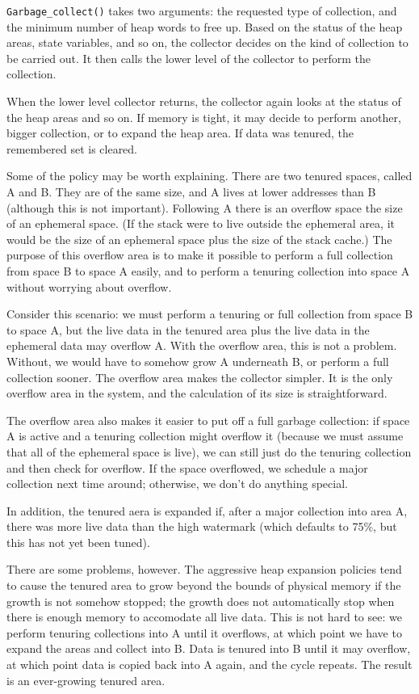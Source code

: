 \verb+Garbage_collect()+ takes two arguments: the requested type of
collection, and the minimum number of heap words to free up. Based on
the status of the heap areas, state variables, and so on, the collector
decides on the kind of collection to be carried out. It then calls the lower
level of the collector to perform the collection.

When the lower level collector returns, the collector again looks at the
status of the heap areas and so on. If memory is tight, it may decide to
perform another, bigger collection, or to expand the heap area. If data was
tenured, the remembered set is cleared.

Some of the policy may be worth explaining. There are two tenured spaces,
called A and B. They are of the same size, and A lives at lower addresses than
B (although this is not important). Following A there is an overflow
space the size of an ephemeral space. (If the stack were to live outside 
the ephemeral area, it would be the size of an ephemeral space plus the size
of the stack cache.) The purpose of this overflow area is to make it possible
to perform a full collection from space B to space A easily, and to perform
a tenuring collection into space A without worrying about overflow.

Consider this scenario: we must perform a tenuring or full collection from
space B to space A, but the live data in the tenured area plus the live data
in the ephemeral data may overflow A. With the overflow area, this is not a
problem. Without, we would have to somehow grow A underneath B, or perform a
full collection sooner. The overflow area makes the collector simpler. It
is the only overflow area in the system, and the calculation of its size
is straightforward.

The overflow area also makes it easier to put off a full garbage collection:
if space A is active and a tenuring collection might overflow it (because we
must assume that all of the ephemeral space is live), we can still just do
the tenuring collection and then check for overflow. If the space
overflowed, we schedule a major collection next time around; otherwise, we
don't do anything special.

In addition, the tenured aera is expanded if, after a major collection into
area A, there was more live data than the high watermark (which defaults to
75\%, but this has not yet been tuned).

There are some problems, however. The aggressive heap expansion policies
tend to cause the tenured area to grow beyond the bounds of physical memory
if the growth is not somehow stopped; the growth does not automatically stop
when there is enough memory to accomodate all live data. This is not hard
to see: we perform tenuring collections into A until it overflows, at which
point we have to expand the areas and collect into B. Data is tenured into
B until it may overflow, at which point data is copied back into A again, and
the cycle repeats. The result is an ever-growing tenured area.

